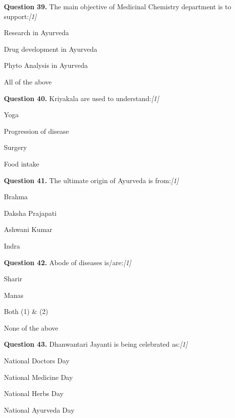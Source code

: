 \documentclass[11pt,a4paper]{article}
\newcommand{\pts}[1]{\hfill   \textit{[#1]}}
\begin{document}
\medskip


\noindent   \textbf{Question 39.} The main objective of Medicinal Chemistry department is to support:\pts{1}

\begin{parts}
  \item Research in Ayurveda
  \item Drug development in Ayurveda
  \item Phyto Analysis in Ayurveda
  \item All of the above
\end{parts}

\medskip


\noindent   \textbf{Question 40.} Kriyakala are used to understand:\pts{1}

\begin{parts}
  \item Yoga
  \item Progression of disease
  \item Surgery
  \item Food intake
\end{parts}

\medskip


\noindent   \textbf{Question 41.} The ultimate origin of Ayurveda is from:\pts{1}

\begin{parts}
  \item Brahma
  \item Daksha Prajapati
  \item Ashwani Kumar
  \item Indra
\end{parts}

\medskip


\noindent   \textbf{Question 42.} Abode of diseases is/are:\pts{1}

\begin{parts}
  \item Sharir
  \item Manas
  \item Both (1) & (2)
  \item None of the above
\end{parts}

\medskip


\noindent   \textbf{Question 43.} Dhanwantari Jayanti is being celebrated as:\pts{1}

\begin{parts}
  \item National Doctors Day
  \item National Medicine Day
  \item National Herbs Day
  \item National Ayurveda Day
\end{parts}
\end{document}
